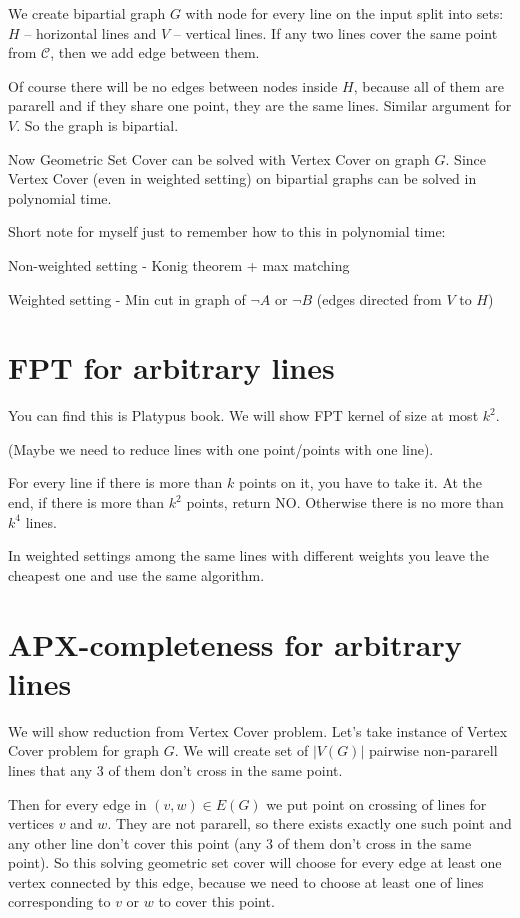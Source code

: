 \documentclass[en]{pracamgr}
\begin{document}
We create bipartial graph $G$ with node for every line on the input
split into sets: $H$ -- horizontal lines and $V$ -- vertical lines.
If any two lines cover the same point from $\mathcal{C}$, then
we add edge between them.

Of course there will be no edges between nodes inside $H$,
because all of them are pararell and if they share 
one point, they are the same lines. Similar argument for $V$.
So the graph is bipartial.

Now Geometric Set Cover can be solved with Vertex Cover on graph $G$.
Since Vertex Cover (even in weighted setting) 
on bipartial graphs can be solved in polynomial time.

Short note for myself just to remember how to this in polynomial time:

Non-weighted setting - Konig theorem + max matching

Weighted setting - Min cut in graph of $\neg A$ or $\neg B$
(edges directed from $V$ to $H$)

\section{FPT for arbitrary lines}
You can find this is Platypus book.
We will show FPT kernel of size at most $k^2$.

(Maybe we need to reduce lines with one point/points with one line).

For every line if there is more than $k$ points on it,
you have to take it. At the end, if there is more than $k^2$ points,
return NO.
Otherwise there is no more than $k^4$ lines.

In weighted settings among the same lines with different weights
you leave the cheapest one and use the same algorithm.

\section{APX-completeness for arbitrary lines}
We will show reduction from Vertex Cover problem.
Let's take instance of Vertex Cover problem for graph $G$.
We will create set of $|V(G)|$ pairwise non-pararell lines
that any 3 of them don't cross in the same point.

Then for every edge in $(v, w) \in E(G)$
we put point on crossing of lines for vertices $v$ and $w$.
They are not pararell, so there exists exactly one such point
and any other line don't cover this point (any 3 of them don't
cross in the same point).
So this solving geometric set cover will choose
for every edge at least one vertex connected by this edge,
because we need to choose at least one of
lines corresponding to $v$ or $w$ to cover this point.
\end{document}
